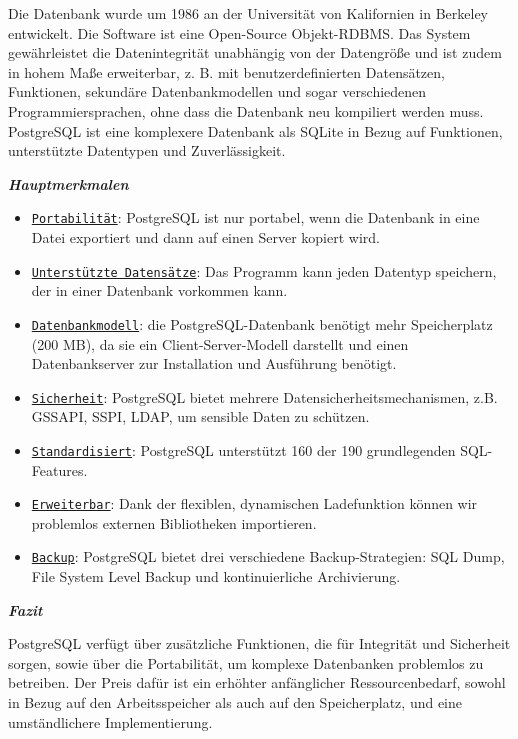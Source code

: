 Die Datenbank wurde um 1986 an der Universität von Kalifornien in Berkeley entwickelt.
Die Software ist eine Open-Source Objekt-RDBMS. Das System gewährleistet die Datenintegrität 
unabhängig von der Datengröße und ist zudem in hohem Maße erweiterbar, z. B. mit benutzerdefinierten
Datensätzen, Funktionen, sekundäre Datenbankmodellen und sogar verschiedenen Programmiersprachen, 
ohne dass die Datenbank neu kompiliert werden muss. PostgreSQL ist eine komplexere Datenbank als
SQLite in Bezug auf Funktionen, unterstützte Datentypen und Zuverlässigkeit. 

\begin{large} \emph{\textbf{Hauptmerkmalen}} \end{large}
\begin{itemize}
    \item \underline{\texttt{Portabilität}}:
        PostgreSQL ist nur portabel, wenn die Datenbank in eine Datei exportiert und dann
        auf einen Server kopiert wird. 
    \item \underline{\texttt{Unterstützte Datensätze}}:
        Das Programm kann jeden Datentyp speichern, der in einer Datenbank vorkommen
        kann. 
    \item \underline{\texttt{Datenbankmodell}}:
        die PostgreSQL-Datenbank benötigt mehr Speicherplatz (200 MB), da sie ein 
        Client-Server-Modell darstellt und einen Datenbankserver zur Installation und 
        Ausführung benötigt.
    \item \underline{\texttt{Sicherheit}}:
        PostgreSQL bietet mehrere Datensicherheitsmechanismen, z.B. GSSAPI, SSPI, LDAP, 
        um sensible Daten zu schützen. 
    \item \underline{\texttt{Standardisiert}}:
         PostgreSQL unterstützt 160 der 190 grundlegenden SQL-Features. 
    \item \underline{\texttt{Erweiterbar}}:
        Dank der flexiblen, dynamischen Ladefunktion können wir problemlos externen 
        Bibliotheken importieren. 
    \item \underline{\texttt{Backup}}:
        PostgreSQL bietet drei verschiedene Backup-Strategien: SQL Dump, File System 
        Level Backup und kontinuierliche Archivierung. 
\end{itemize} 
\begin{large} \emph{\textbf{Fazit}} \end{large}
PostgreSQL verfügt über zusätzliche Funktionen, die für Integrität und Sicherheit sorgen,
sowie über die Portabilität, um komplexe Datenbanken problemlos zu betreiben. Der Preis
dafür ist ein erhöhter anfänglicher Ressourcenbedarf, sowohl in Bezug auf den 
Arbeitsspeicher als auch auf den Speicherplatz, und eine umständlichere Implementierung. 